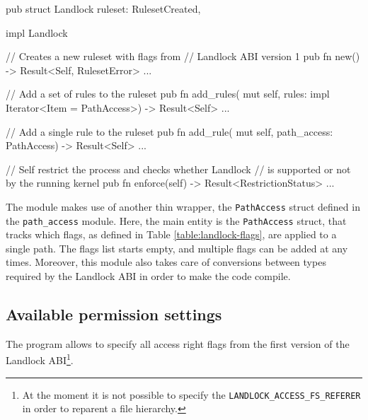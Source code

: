 \begin{code}[language=Rust, caption=The outline of the \texttt{landlock} module., label=lst:rust-landlock]
pub struct Landlock {
  ruleset: RulesetCreated,
}

impl Landlock {
  // Creates a new ruleset with flags from
  // Landlock ABI version 1
  pub fn new() -> Result<Self, RulesetError> {...}

  // Add a set of rules to the ruleset
  pub fn add_rules(
    mut self,
    rules: impl Iterator<Item = PathAccess>)
    -> Result<Self>
  {...}

  // Add a single rule to the ruleset
  pub fn add_rule(
    mut self,
    path_access: PathAccess) -> Result<Self>
  {...}

  // Self restrict the process and checks whether Landlock
  // is supported or not by the running kernel
  pub fn enforce(self) -> Result<RestrictionStatus> {...}
}
\end{code}

The module makes use of another thin wrapper, the \texttt{PathAccess} struct defined in the \texttt{path\_access} module.
Here, the main entity is the \texttt{PathAccess} struct, that tracks which flags, as defined in Table \ref{table:landlock-flags},
are applied to a single path. The flags list starts empty, and multiple flags can be added at any times.
Moreover, this module also takes care of conversions between types required by the Landlock ABI in order
to make the code compile.

\subsection{Available permission settings}

The program allows to specify all access right flags from the first version of the Landlock
ABI\footnote{At the moment it is not possible to specify the \texttt{LANDLOCK\_ACCESS\_FS\_REFERER} in order to reparent a file hierarchy.}.

